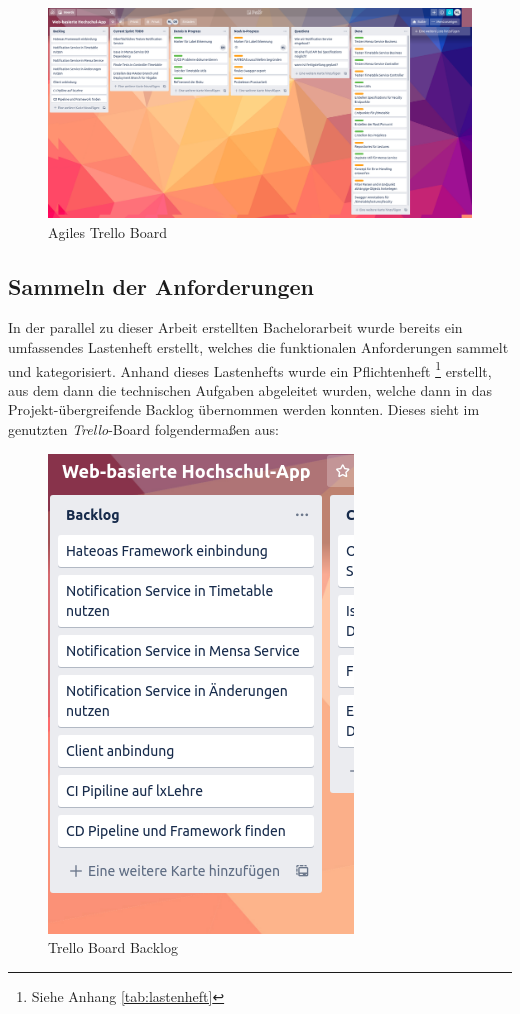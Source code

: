 \begin{figure}[H]
\centering
\includegraphics[width=\pictureWidth cm + 2 cm]{Bilder/Kapitel_2/trello_board.png}
\caption{Agiles Trello Board\label{fig:trello_board}}
\end{figure}

\subsection*{Sammeln der Anforderungen}

In der parallel zu dieser Arbeit erstellten Bachelorarbeit wurde bereits ein umfassendes Lastenheft erstellt, welches die funktionalen Anforderungen sammelt und kategorisiert. Anhand dieses Lastenhefts wurde ein Pflichtenheft \footnote{Siehe Anhang \ref{tab:lastenheft}} erstellt, aus dem dann die technischen Aufgaben abgeleitet wurden, welche dann in das Projekt-übergreifende Backlog übernommen werden konnten. Dieses sieht im genutzten \textit{Trello}-Board folgendermaßen aus:

\begin{figure}[H]
\centering
\includegraphics[width=5 cm]{Bilder/Kapitel_2/backlog.png}
\caption{Trello Board Backlog\label{fig:trello_backlog}}
\end{figure}

